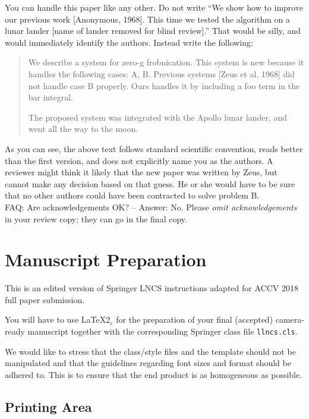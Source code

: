 \documentclass[runningheads]{llncs}
\begin{document}
You can handle this paper like any other.  Do not write ``We show how to
improve our previous work [Anonymous, 1968].  This time we tested the
algorithm on a lunar lander [name of lander removed for blind review].''
That would be silly, and would immediately identify the authors. Instead
write the following:
%
\begin{quotation}
\noindent
   We describe a system for zero-g frobnication.  This
   system is new because it handles the following cases:
   A, B.  Previous systems [Zeus et al. 1968] did not
   handle case B properly.  Ours handles it by including
   a foo term in the bar integral.

   The proposed system was integrated with the Apollo
   lunar lander, and went all the way to the moon.  
\end{quotation}
%
As you can see, the above text follows standard scientific convention,
reads better than the first version, and does not explicitly name you as
the authors.  A reviewer might think it likely that the new paper was
written by Zeus, but cannot make any decision based on that guess.
He or she would have to be sure that no other authors could have been
contracted to solve problem B. \\

\noindent FAQ: Are acknowledgements OK?  -- Answer: No. Please {\it omit
acknowledgements} in your review copy; they can go in the final copy.

\section{Manuscript Preparation}

This is an edited version of Springer LNCS instructions adapted for
ACCV 2018 full paper submission. 

You will have to use \LaTeX2$_\varepsilon$ for the
preparation of your final (accepted)
camera-ready manuscript together with the corresponding Springer
class file \verb+llncs.cls+.

We would like to stress that the class/style files and the template
should not be manipulated and that the guidelines regarding font sizes
and format should be adhered to. This is to ensure that the end product
is as homogeneous as possible.

\subsection{Printing Area}
\end{document}
